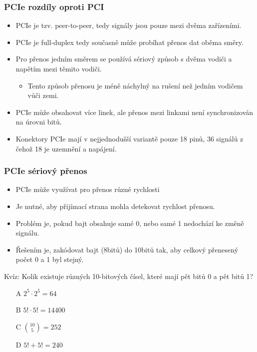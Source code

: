 \documentclass{beamer}
\begin{document}
\begin{frame}
\frametitle{PCIe rozdíly oproti PCI}

\begin{itemize}
\item PCIe je tzv. peer-to-peer, tedy signály jsou pouze mezi dvěma zařízeními.
\item PCIe je full-duplex tedy současně může probíhat přenos dat oběma směry.
\item Pro přenos jedním směrem se používá sériový způsob s dvěma vodiči a napětím mezi těmito vodiči.
\begin{itemize}
\item Tento způsob přenosu je méně náchylný na rušení než jedním vodičem vůči zemi.
\end{itemize}
\item PCIe může obsahovat více linek, ale přenos mezi linkami není synchronizován na úrovni bitů.
\item Konektory PCIe mají v nejjednodušší variantě pouze 18 pinů, 36 signálů z čehož 18 je uzemnění a napájení.
\end{itemize}

\end{frame}

\begin{frame}
\frametitle{PCIe sériový přenos}

\begin{itemize}
\item PCIe může využívat pro přenos různé rychlosti
\item Je nutné, aby přijímací strana mohla detekovat rychlost přenosu.
\item Problém je, pokud bajt obsahuje samé 0, nebo samé 1 nedochází ke změně signálu.
\item Řešením je, zakódovat bajt (8bitů) do 10bitů tak, aby celkový přenesený počet 0 a 1 byl stejný.
\end{itemize}

Kvíz: Kolik existuje různých 10-bitových čísel, které mají pět bitů 0 a pět bitů 1?
\begin{itemize}
\item[A] $2^5 \cdot 2^5 = 64$
\item[B] $5! \cdot 5! = 14400$
\item[C] ${10 \choose 5} = 252$
\item[D] $5! + 5! = 240$
\end{itemize}
\end{frame}
\end{document}
